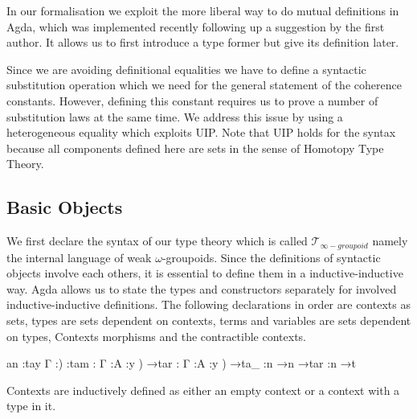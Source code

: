 \documentclass{acm_proc_article-sp}
\newcommand{\wog}{weak $\omega$-groupoids}
\newcommand{\tig}{$\mathcal{T}_{\infty-groupoid}$}
\begin{document}
In our formalisation we exploit the more liberal way to do mutual
definitions in Agda, which was implemented recently following up a
suggestion by the first author. It allows us to first introduce a type
former but give its definition later.

Since we are avoiding definitional equalities we have to define a
syntactic substitution operation which we need for the general
statement of the coherence constants. However, defining this constant
requires us to prove a number of substitution laws at the same
time. We address this issue by using a heterogeneous equality which
exploits UIP. Note that UIP holds for
the syntax because all components defined here
are sets in the sense of Homotopy Type Theory.



\subsection{Basic Objects}

We first declare the syntax of our type theory which is
called \tig{} namely the internal language of \wog. Since the definitions of syntactic objects involve each others, it is essential to define them in a inductive-inductive way. Agda allows us to state the types and constructors separately for involved inductive-inductive definitions. The following declarations in order are contexts as sets,
types are sets dependent on contexts, terms and variables are sets
dependent on types, Contexts morphisms and the contractible contexts.

\begin{code}%
\>an           :tay \AgdaBound{(}Γ :)  :tam            : \AgdaBound{\{}Γ :\AgdaBound{(}A :y ) →tar           : \AgdaBound{\{}Γ :\AgdaBound{(}A :y ) →ta\_           :n →n →tar       :n →t
\<%
\end{code}
Contexts are inductively defined as either an empty context or
a context with a type in it.
\end{document}
